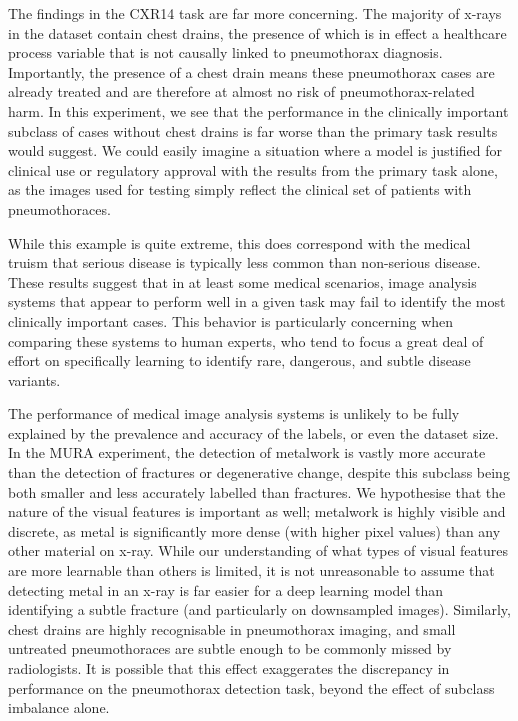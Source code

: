 \documentclass{article}
\begin{document}
The findings in the CXR14 task are far more concerning. 
The majority of x-rays in the dataset contain chest drains, the presence of which is in effect a healthcare process variable that is not causally linked to pneumothorax diagnosis.
 Importantly, the presence of a chest drain means these pneumothorax cases are already treated and are therefore at almost no risk of pneumothorax-related harm. 
 In this experiment, we see that the performance in the clinically important subclass of cases without chest drains is far worse than the primary task results would suggest. 
 We could easily imagine a situation where a model is justified for clinical use or regulatory approval with the results from the primary task alone, as the images used for testing simply reflect the clinical set of patients with pneumothoraces.
 
While this example is quite extreme, this does correspond with the medical truism that serious disease is typically less common than non-serious disease. 
These results suggest that in at least some medical scenarios, image analysis systems that appear to perform well in a given task may fail to identify the most clinically important cases. 
This behavior is particularly concerning when comparing these systems to human experts, who tend to focus a great deal of effort on specifically learning to identify rare, dangerous, and subtle disease variants.

The performance of medical image analysis systems is unlikely to be fully explained by the prevalence and accuracy of the labels, or even the dataset size. 
In the MURA experiment, the detection of metalwork is vastly more accurate than the detection of fractures or degenerative change, despite this subclass being both smaller and less accurately labelled than fractures. 
We hypothesise that the nature of the visual features is important as well; metalwork is highly visible and discrete, as metal is significantly more dense (with higher pixel values) than any other material on x-ray. 
While our understanding of what types of visual features are more learnable than others is limited, it is not unreasonable to assume that detecting metal in an x-ray is far easier for a deep learning model than identifying a subtle fracture (and particularly on downsampled images).
Similarly, chest drains are highly recognisable in pneumothorax imaging, and small untreated pneumothoraces are subtle enough to be commonly missed by radiologists. 
It is possible that this effect exaggerates the discrepancy in performance on the pneumothorax detection task, beyond the effect of subclass imbalance alone.
\end{document}
